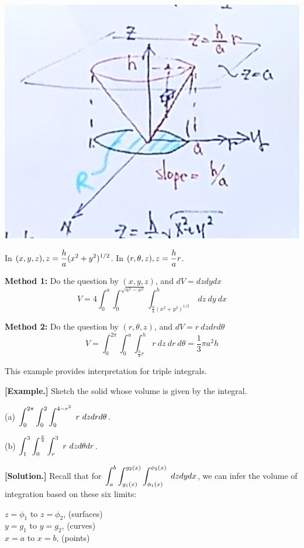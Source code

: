 \documentclass[11pt, a4paper]{MATH2023}
\newcommand{\eg}{\textbf{[Example.] }}
\newcommand{\sol}{\textbf{[Solution.] }}
\begin{document}
\begin{spacing}{1.3}
    \begin{center}
        \includegraphics[scale=0.25]{images/Ch14-int-cylind-eg1.JPG}
    \end{center}

    In $(x,y,z), \displaystyle z=\frac{h}{a}(x^2+y^2)^{1/2}$. \quad 
    In $\displaystyle (r,\theta,z), z=\frac{h}{a}r$.

    {\bf Method 1:} Do the question by $(x,y,z)$, and $dV=dzdydx$
    $$V=4\int_{0}^a\int_0^{\sqrt{a^2-x^2}}\int_{\frac{h}{a}(x^2+y^2)^{1/2}}^{h}\ dz\ dy\ dx$$

    {\bf Method 2:} Do the question by $(r,\theta,z)$, and $dV=r\ dzdrd\theta$
    $$V=\int_0^{2\pi} \int_0^a \int_{\frac{h}{a}r}^h\ r\ dz\ dr\ d\theta=\dfrac{1}{3}\pi a^2h$$

    \newpage
    {\blue This example provides interpretation for triple integrals.}

    \eg Sketch the solid whose volume is given by the integral.

    (a) $\displaystyle \int_0^{2\pi} \int_0^2 \int_0^{4-r^2}\ r\ dzdrd\theta$.

    (b) $\displaystyle \int_1^3 \int_0^{\frac{\pi}{2}} \int_r^3\ r\ dzd\theta dr$.

    \sol Recall that for $\displaystyle \int_a^b \int_{g_1(x)}^{g_2(x)} \int_{\phi_1(x)}^{\phi_2(x)}\ dzdydx$,
    we can infer the volume of integration based on these six limits: 

    $z=\phi_1$ to $z=\phi_2$, (surfaces)\\
    $y=g_1$ to $y=g_2$, (curves)\\
    $x=a$ to $x=b$, (points)


\end{spacing}
\end{document}
